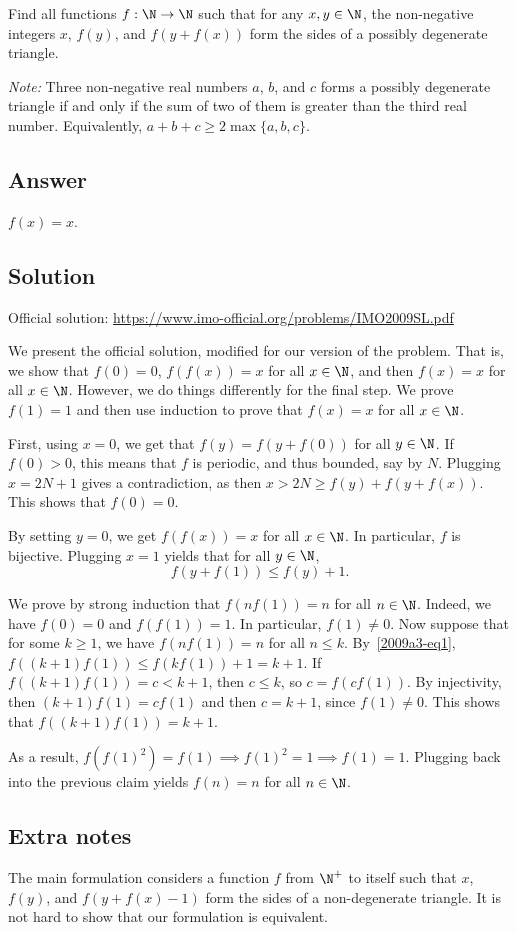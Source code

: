 Find all functions $f : \N \to \N$ such that for any $x, y \in \N$, the non-negative integers $x$, $f(y)$, and $f(y + f(x))$ form the sides of a possibly degenerate triangle.

\emph{Note:}
Three non-negative real numbers $a$, $b$, and $c$ forms a possibly degenerate triangle if and only if the sum of two of them is greater than the third real number.
Equivalently, $a + b + c \geq 2 \max\{a, b, c\}$.



\subsection*{Answer}

$f(x) = x$.



\subsection*{Solution}

Official solution: \url{https://www.imo-official.org/problems/IMO2009SL.pdf}

We present the official solution, modified for our version of the problem.
That is, we show that $f(0) = 0$, $f(f(x)) = x$ for all $x \in \N$, and then $f(x) = x$ for all $x \in \N$.
However, we do things differently for the final step.
We prove $f(1) = 1$ and then use induction to prove that $f(x) = x$ for all $x \in \N$.

First, using $x = 0$, we get that $f(y) = f(y + f(0))$ for all $y \in \N$.
If $f(0) > 0$, this means that $f$ is periodic, and thus bounded, say by $N$.
Plugging $x = 2N + 1$ gives a contradiction, as then $x > 2N \geq f(y) + f(y + f(x))$.
This shows that $f(0) = 0$.

By setting $y = 0$, we get $f(f(x)) = x$ for all $x \in \N$.
In particular, $f$ is bijective.
Plugging $x = 1$ yields that for all $y \in \N$,
\[ f(y + f(1)) \leq f(y) + 1. \tag{1}\label{2009a3-eq1} \]

We prove by strong induction that $f(n f(1)) = n$ for all $n \in \N$.
Indeed, we have $f(0) = 0$ and $f(f(1)) = 1$.
In particular, $f(1) \neq 0$.
Now suppose that for some $k \geq 1$, we have $f(n f(1)) = n$ for all $n \leq k$.
By~\eqref{2009a3-eq1}, $f((k + 1) f(1)) \leq f(k f(1)) + 1 = k + 1$.
If $f((k + 1) f(1)) = c < k + 1$, then $c \leq k$, so $c = f(c f(1))$.
By injectivity, then $(k + 1) f(1) = c f(1)$ and then $c = k + 1$, since $f(1) \neq 0$.
This shows that $f((k + 1) f(1)) = k + 1$.

As a result, $f(f(1)^2) = f(1) \implies f(1)^2 = 1 \implies f(1) = 1$.
Plugging back into the previous claim yields $f(n) = n$ for all $n \in \N$.



\subsection*{Extra notes}

The main formulation considers a function $f$ from $\N^+$ to itself such that $x$, $f(y)$, and $f(y + f(x) - 1)$ form the sides of a non-degenerate triangle.
It is not hard to show that our formulation is equivalent.
